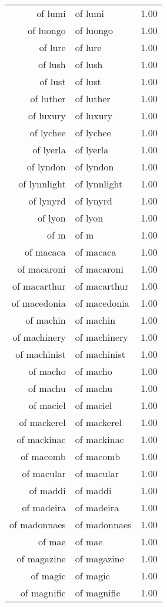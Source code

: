 \begin{table}[ht]
\begin{tabular}{rlr}
  of lumi & of lumi & 1.00 \\ 
  of luongo & of luongo & 1.00 \\ 
  of lure & of lure & 1.00 \\ 
  of lush & of lush & 1.00 \\ 
  of lust & of lust & 1.00 \\ 
  of luther & of luther & 1.00 \\ 
  of luxury & of luxury & 1.00 \\ 
  of lychee & of lychee & 1.00 \\ 
  of lyerla & of lyerla & 1.00 \\ 
  of lyndon & of lyndon & 1.00 \\ 
  of lynnlight & of lynnlight & 1.00 \\ 
  of lynyrd & of lynyrd & 1.00 \\ 
  of lyon & of lyon & 1.00 \\ 
  of m & of m & 1.00 \\ 
  of macaca & of macaca & 1.00 \\ 
  of macaroni & of macaroni & 1.00 \\ 
  of macarthur & of macarthur & 1.00 \\ 
  of macedonia & of macedonia & 1.00 \\ 
  of machin & of machin & 1.00 \\ 
  of machinery & of machinery & 1.00 \\ 
  of machinist & of machinist & 1.00 \\ 
  of macho & of macho & 1.00 \\ 
  of machu & of machu & 1.00 \\ 
  of maciel & of maciel & 1.00 \\ 
  of mackerel & of mackerel & 1.00 \\ 
  of mackinac & of mackinac & 1.00 \\ 
  of macomb & of macomb & 1.00 \\ 
  of macular & of macular & 1.00 \\ 
  of maddi & of maddi & 1.00 \\ 
  of madeira & of madeira & 1.00 \\ 
  of madonnaes & of madonnaes & 1.00 \\ 
  of mae & of mae & 1.00 \\ 
  of magazine & of magazine & 1.00 \\ 
  of magic & of magic & 1.00 \\ 
  of magnific & of magnific & 1.00 \\ 

\end{tabular}
\end{table}
